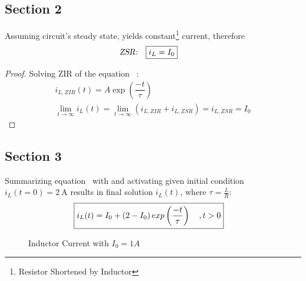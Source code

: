 \documentclass[12pt,a4paper,titlepage]{article}
\makeatletter
\newcommand{\green}{\color{Turquoise} \usefont{OT1}{lmss}{m}{n}}
\let\reftagform@=\tagform@
\def\tagform@#1{\maketag@@@{(\ignorespaces\textcolor{red}{#1}\unskip\@@italiccorr)}}
\renewcommand{\eqref}[1]{\textup{\reftagform@{\ref{#1}}}}
\makeatother
\begin{document}
{\subsection{Section 2}{
Assuming circuit's steady state, yields constant\footnote{Resistor Shortened by Inductor} current, therefore
\begin{align}
\textsl{ZSR:\quad} \Aboxed{i_L&=I_0 \label{eq:6}}
\end{align}
\begin{proof}
Solving ZIR of the equation~\eqref{eq:5} :
\begin{align}
i_{L,ZIR}(t)=A\exp({\dfrac{-t}{\tau}})\label{eq:7}\\
\lim_{t \to \infty}i_{L}(t)=\lim_{t \to \infty}\left(i_{L, ZIR}+i_{L,ZSR}\right)=i_{L, ZSR}=I_0 \nonumber
\end{align}
\end{proof}
}\label{sub:sub2}%
\subsection{Section 3}{
Summarizing equation~\eqref{eq:6} with \eqref{eq:7} and activating given initial condition $i_L(t=0)=2~\si{\A}$ results in final solution $i_L(t)$, where $\tau=\frac{L}{R}$:
\begin{align*}
\Aboxed{i_{L}(t)=I_0+\left(2- I_0\right)exp\left({\dfrac{-t}{\tau}}\right) \quad, t>0}
\end{align*}
\begin{figure}[!htb]
\centering
\caption{\green Inductor Current with $I_0=1A$}
\label{fig:q1fig2}
\end{figure}
}\label{sub:sub3}
}\label{sec:q1sec}
\end{document}
